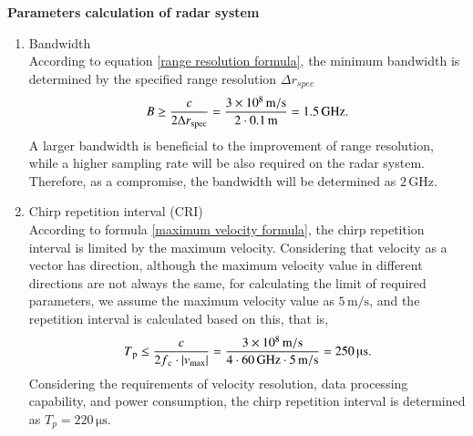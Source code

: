 \documentclass[12pt,DIV14,BCOR12mm,a4paper,footinclude=false,headinclude,parskip=half-,twoside,openright,cleardoublepage=empty,toc=index,bibliography=totoc,listof=totoc]{scrreprt}
\numberwithin{equation}{chapter}
\begin{document}
\begin{spacing}{1.5}
\textbf{\large{Parameters calculation of radar system}}
\end{spacing}

\begin{enumerate}

    \item Bandwidth\\
    According to equation \ref{range resolution formula}, the minimum bandwidth is determined by the specified range resolution $\Delta r_{spec}$
    \begin{equation}
        \centering
        B \geq \frac{c}{2\Delta r\textsubscript{spec}} = \frac{3 \times 10\textsuperscript{8}\,\mathrm{m/s}}{2 \cdot 0.1\,\mathrm{m}} = 1.5\,\mathrm{GHz}.
    \end{equation}
    A larger bandwidth is beneficial to the improvement of range resolution, while a higher sampling rate will be also required on the radar system. Therefore, as a compromise, the bandwidth will be determined as $2\,\mathrm{GHz}$.
    
    \item Chirp repetition interval (CRI)\\
    According to formula \ref{maximum velocity formula}, the chirp repetition interval is limited by the maximum velocity. Considering that velocity as a vector has direction, although the maximum velocity value in different directions are not always the same, for calculating the limit of required parameters, we assume the maximum velocity value as $5\,\mathrm{m/s}$, and the repetition interval is calculated based on this, that is,
    \begin{equation}
        \centering
        T\textsubscript{p} \leq \frac{c}{2f\textsubscript{c} \cdot \left|v\textsubscript{max}\right|} = \frac{3 \times 10\textsuperscript{8}\,\mathrm{m/s}}{4\cdot 60\,\mathrm{GHz} \cdot 5\,\mathrm{m/s}} = 250\,\text{\textmu s}.
    \end{equation}
    Considering the requirements of velocity resolution, data processing capability, and power consumption, the chirp repetition interval is determined as $T_p=220\,\mathrm{\mu s}$.


\end{enumerate}
\end{document}
